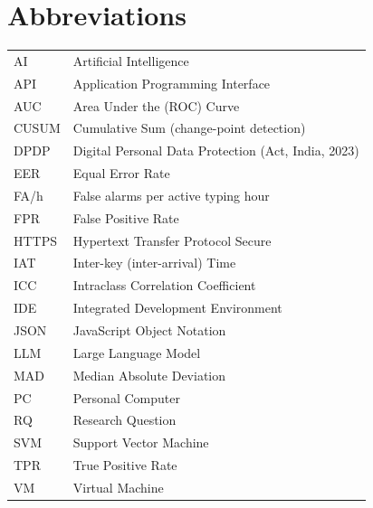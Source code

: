\chapter*{Abbreviations}

\begin{tabular}{@{}ll}
AI    & Artificial Intelligence \\
API   & Application Programming Interface \\
AUC   & Area Under the (ROC) Curve \\
CUSUM & Cumulative Sum (change-point detection) \\
DPDP  & Digital Personal Data Protection (Act, India, 2023) \\
EER   & Equal Error Rate \\
FA/h  & False alarms per active typing hour \\
FPR   & False Positive Rate \\
HTTPS & Hypertext Transfer Protocol Secure \\
IAT   & Inter-key (inter-arrival) Time \\
ICC   & Intraclass Correlation Coefficient \\
IDE   & Integrated Development Environment \\
JSON  & JavaScript Object Notation \\
LLM   & Large Language Model \\
MAD   & Median Absolute Deviation \\
PC    & Personal Computer \\
RQ    & Research Question \\
SVM   & Support Vector Machine \\
TPR   & True Positive Rate \\
VM    & Virtual Machine \\
\end{tabular}
